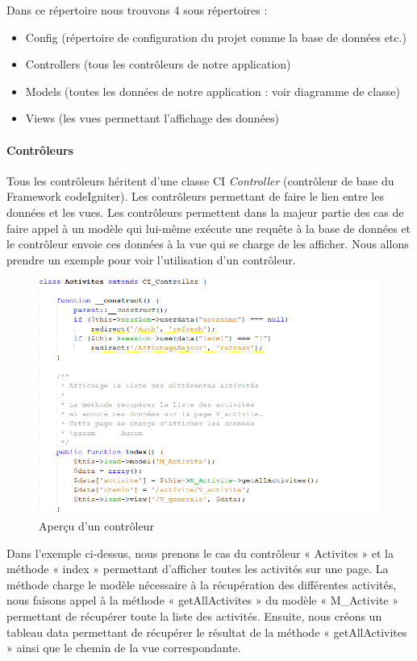 \documentclass[noposter]{polytech/polytech}
\begin{document}
Dans ce répertoire nous trouvons 4 sous répertoires : 

\begin{itemize}
	\item Config (répertoire de configuration du projet comme la base de données etc.)
	\item Controllers (tous les contrôleurs de notre application)
	\item Models (toutes les données de notre application : voir diagramme de classe)
	\item Views (les vues permettant l’affichage des données) 
\end{itemize}

\paragraph{Contrôleurs}

Tous les contrôleurs héritent d'une classe CI \textit{Controller} (contrôleur de base du Framework codeIgniter). Les contrôleurs permettant de faire le lien entre les données et les vues. Les contrôleurs permettent dans la majeur partie des cas de faire appel à un modèle qui lui-même exécute une requête à la base de données et le contrôleur envoie ces données à la vue qui se charge de les afficher. 
Nous allons prendre un exemple pour voir l'utilisation d’un contrôleur. 

\begin{figure}
	\includegraphics[scale=0.75]{images/controleur}
	\caption{Aperçu d'un contrôleur}
	\label{fig:controleur}
\end{figure}

Dans l'exemple ci-dessus, nous prenons le cas du contrôleur « Activites » et la méthode « index » permettant d'afficher toutes les activités sur une page. La méthode charge le modèle nécessaire à la récupération des différentes activités, nous faisons appel à la méthode « getAllActivites » du modèle « M\_Activite » permettant de récupérer toute la liste des activités. Ensuite, nous créons un tableau data permettant de récupérer le résultat de la méthode « getAllActivites » ainsi que le chemin de la vue correspondante. 
\end{document}
